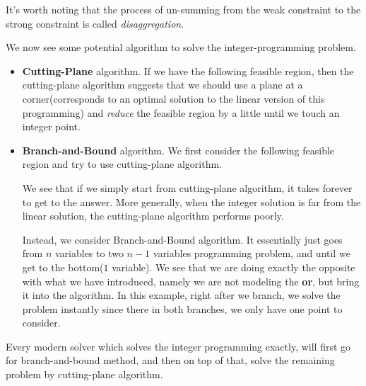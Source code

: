 It's worth noting that the process of un-summing from the weak constraint to the strong constraint is called \emph{disaggregation}.

\hr

We now see some potential algorithm to solve the integer-programming problem.
\begin{itemize}
	\item \textbf{Cutting-Plane} algorithm. If we have the following feasible region, then the cutting-plane algorithm suggests
	      that we should use a plane at a corner(corresponds to an optimal solution to the linear version of this programming) and
	      \emph{reduce} the feasible region by a little until we touch an integer point.
	      \begin{figure}[H]
		      \centering
		      \label{fig:integer-programming-cutting-plane}
	      \end{figure}
	\item \label{eg:branch-and-bound}\textbf{Branch-and-Bound} algorithm. We first consider the following feasible region and try to use cutting-plane algorithm.
	      \begin{figure}[H]
		      \centering
		      \label{fig:integer-programming-branch-and-bound}
	      \end{figure}
	      We see that if we simply start from cutting-plane algorithm, it takes forever to get to the answer. More generally, when the
	      integer solution is far from the linear solution, the cutting-plane algorithm performs poorly.

	      \par Instead, we consider Branch-and-Bound algorithm. It essentially just goes from \(n\) variables to two \(n-1\) variables
	      programming problem, and until we get to the bottom(\(1\) variable). We see that we are doing exactly the opposite with what we have
	      introduced, namely we are not modeling the \textbf{or}, but bring it into the algorithm. In this example, right after we branch,
	      we solve the problem instantly since there in both branches, we only have one point to consider.
\end{itemize}
\begin{note}
	Every modern solver which solves the integer programming exactly, will first go for branch-and-bound method, and then on top of that, solve the
	remaining problem by cutting-plane algorithm.
\end{note}